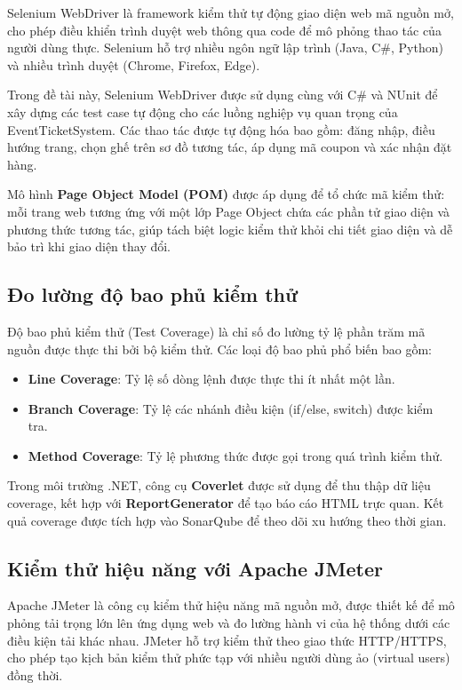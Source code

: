 \documentclass[../main.tex]{subfiles}
\begin{document}
Selenium WebDriver là framework kiểm thử tự động giao diện web mã nguồn mở, cho phép điều khiển trình duyệt web thông qua code để mô phỏng thao tác của người dùng thực. Selenium hỗ trợ nhiều ngôn ngữ lập trình (Java, C\#, Python) và nhiều trình duyệt (Chrome, Firefox, Edge).

Trong đề tài này, Selenium WebDriver được sử dụng cùng với C\# và NUnit để xây dựng các test case tự động cho các luồng nghiệp vụ quan trọng của EventTicketSystem. Các thao tác được tự động hóa bao gồm: đăng nhập, điều hướng trang, chọn ghế trên sơ đồ tương tác, áp dụng mã coupon và xác nhận đặt hàng.

Mô hình \textbf{Page Object Model (POM)} được áp dụng để tổ chức mã kiểm thử: mỗi trang web tương ứng với một lớp Page Object chứa các phần tử giao diện và phương thức tương tác, giúp tách biệt logic kiểm thử khỏi chi tiết giao diện và dễ bảo trì khi giao diện thay đổi.

\subsection{Đo lường độ bao phủ kiểm thử}

Độ bao phủ kiểm thử (Test Coverage) là chỉ số đo lường tỷ lệ phần trăm mã nguồn được thực thi bởi bộ kiểm thử. Các loại độ bao phủ phổ biến bao gồm:

\begin{itemize}
    \item \textbf{Line Coverage}: Tỷ lệ số dòng lệnh được thực thi ít nhất một lần.
    \item \textbf{Branch Coverage}: Tỷ lệ các nhánh điều kiện (if/else, switch) được kiểm tra.
    \item \textbf{Method Coverage}: Tỷ lệ phương thức được gọi trong quá trình kiểm thử.
\end{itemize}

Trong môi trường .NET, công cụ \textbf{Coverlet} được sử dụng để thu thập dữ liệu coverage, kết hợp với \textbf{ReportGenerator} để tạo báo cáo HTML trực quan. Kết quả coverage được tích hợp vào SonarQube để theo dõi xu hướng theo thời gian.

\subsection{Kiểm thử hiệu năng với Apache JMeter}

Apache JMeter là công cụ kiểm thử hiệu năng mã nguồn mở, được thiết kế để mô phỏng tải trọng lớn lên ứng dụng web và đo lường hành vi của hệ thống dưới các điều kiện tải khác nhau. JMeter hỗ trợ kiểm thử theo giao thức HTTP/HTTPS, cho phép tạo kịch bản kiểm thử phức tạp với nhiều người dùng ảo (virtual users) đồng thời.
\end{document}
